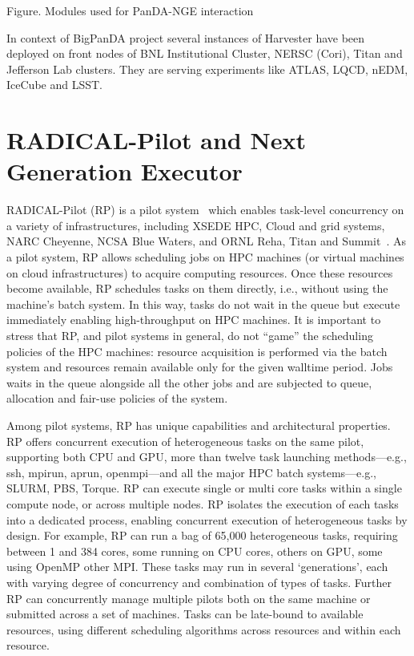 \documentclass{webofc}
\begin{document}
Figure. Modules used for PanDA-NGE interaction

In context of BigPanDA project several instances of Harvester have been deployed on front nodes of BNL Institutional Cluster, NERSC (Cori), Titan and Jefferson Lab clusters. They are serving experiments like ATLAS, LQCD, nEDM, IceCube and LSST. 


\section{RADICAL-Pilot and Next Generation Executor}

RADICAL-Pilot (RP) is a pilot system~\cite{turillirp} which enables task-level concurrency on a variety of infrastructures, including XSEDE HPC, Cloud and grid systems, NARC Cheyenne, NCSA Blue Waters, and ORNL Reha, Titan and Summit~\cite{rp-journal}. As a pilot system, RP allows scheduling jobs on HPC machines (or virtual machines on cloud infrastructures) to acquire computing resources. Once these resources become available, RP schedules tasks on them directly, i.e., without using the machine’s batch system. In this way, tasks do not wait in the queue but execute immediately enabling high-throughput on HPC machines. It is important to stress that RP, and pilot systems in general, do not “game” the scheduling policies of the HPC machines: resource acquisition is performed via the batch system and resources remain available only for the given walltime period. Jobs waits in the queue alongside all the other jobs and are subjected to queue, allocation and fair-use policies of the system.
	
	Among pilot systems, RP has unique capabilities and architectural properties. RP offers concurrent execution of heterogeneous tasks on the same pilot, supporting both CPU and GPU, more than twelve task launching methods---e.g., ssh, mpirun, aprun, openmpi---and all the major HPC batch systems---e.g., SLURM, PBS, Torque. RP can execute single or multi core tasks within a single compute node, or across multiple nodes. RP isolates the execution of each tasks into a dedicated process, enabling concurrent execution of heterogeneous tasks by design. For example, RP can run a bag of 65,000 heterogeneous tasks, requiring between 1 and 384 cores, some running on CPU cores, others on GPU, some using OpenMP other MPI. These tasks may run in several ‘generations’, each with varying degree of concurrency and combination of types of tasks. Further RP can concurrently manage multiple pilots both on the same machine or submitted across a set of machines. Tasks can be late-bound to available resources, using different scheduling algorithms across resources and within each resource.
	
\end{document}
